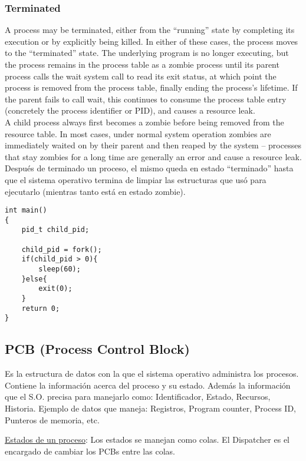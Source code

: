 \documentclass[a4paper, twoside]{article}
\begin{document}
\subsubsection{Terminated}
A process may be terminated, either from the ``running'' state by completing its execution or by explicitly being killed. In either of these cases, the process moves to the ``terminated'' state. The underlying program is no longer executing, but the process remains in the process table as a zombie process until its parent process calls the wait system call to read its exit status, at which point the process is removed from the process table, finally ending the process's lifetime. If the parent fails to call wait, this continues to consume the process table entry (concretely the process identifier or PID), and causes a resource leak.\\

A child process always first becomes a zombie before being removed from the resource table. In most cases, under normal system operation zombies are immediately waited on by their parent and then reaped by the system – processes that stay zombies for a long time are generally an error and cause a resource leak.\\

Después de terminado un proceso, el mismo queda en estado ``terminado'' hasta que el sistema operativo termina de limpiar las estructuras que usó para ejecutarlo (mientras tanto está en estado zombie).

\begin{lstlisting}
int main()
{
	pid_t child_pid;

	child_pid = fork();
	if(child_pid > 0){
		sleep(60);
	}else{
		exit(0);
	}
	return 0;
}
\end{lstlisting}

\subsection{PCB (Process Control Block)}
Es la estructura de datos con la que el sistema operativo administra los procesos.
Contiene la información acerca del proceso y su estado.
Además la información que el S.O. precisa para manejarlo como: Identificador, Estado, Recursos, Historia.
Ejemplo de datos que maneja: Registros, Program counter, Process ID, Punteros de memoria, etc.

\underline{Estados de un proceso}:
Los estados se manejan como colas.
El Dispatcher es el encargado de cambiar los PCBs entre las colas.
\end{document}
